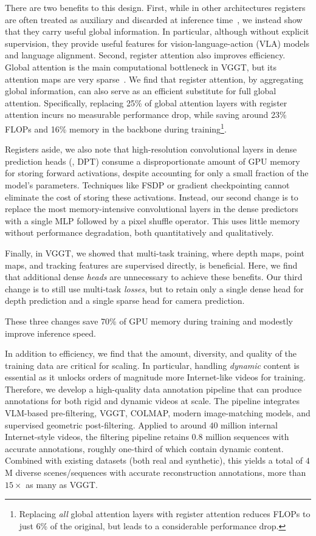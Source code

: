There are two benefits to this design.
First, while in other architectures registers are often treated as auxiliary and discarded at inference time~\cite{darcet24vision}, we instead show that they carry useful global information.
In particular, although without explicit supervision, they provide useful features for vision-language-action (VLA) models and language alignment.
Second, register attention also improves efficiency.
Global attention is the main computational bottleneck in VGGT, but its attention maps are very sparse~\cite{shen26fastvggt:, wang25faster}.
We find that register attention, by aggregating global information, can also serve as an efficient substitute for full global attention.
Specifically, replacing 25\% of global attention layers with register attention incurs no measurable performance drop, while saving around 23\% FLOPs and 16\% memory in the backbone during training\footnote{Replacing \textit{all} global attention layers with register attention reduces FLOPs to just 6\% of the original, but leads to a considerable performance drop.}.

Registers aside, we also note that high-resolution convolutional layers in dense prediction heads (\eg, DPT) consume a disproportionate amount of GPU memory for storing forward activations, despite accounting for only a small fraction of the model's parameters.
Techniques like FSDP or gradient checkpointing cannot eliminate the cost of storing these activations.
Instead, our second change is to replace the most memory-intensive convolutional layers in the dense predictors with a single MLP followed by a pixel shuffle operator.
This uses little memory without performance degradation, both quantitatively and qualitatively.

Finally, in VGGT, we showed that multi-task training, where depth maps, point maps, and tracking features are supervised directly, is beneficial.
Here, we find that additional dense \textit{heads} are unnecessary to achieve these benefits.
Our third change is to still use multi-task \textit{losses}, but to retain only a single dense head for depth prediction and a single sparse head for camera prediction.

These three changes save 70\% of GPU memory during training and modestly improve inference speed.

In addition to efficiency, we find that the amount, diversity, and quality of the training data are critical for scaling.
In particular, handling \emph{dynamic} content is essential as it unlocks orders of magnitude more Internet-like videos for training.
Therefore, we develop a high-quality data annotation pipeline that can produce annotations for both rigid and dynamic videos at scale.
The pipeline integrates VLM-based pre-filtering, VGGT, COLMAP, modern image-matching models, and supervised geometric post-filtering.
Applied to around $40$ million internal Internet-style videos, the filtering pipeline retains $0.8$ million sequences with accurate annotations, roughly one-third of which contain dynamic content.
Combined with existing datasets (both real and synthetic), this yields a total of $4$M diverse scenes/sequences with accurate reconstruction annotations, more than $15\times$ as many as VGGT\@.

